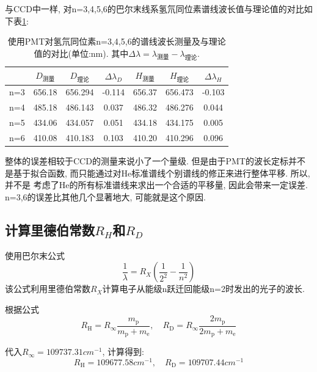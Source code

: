 \documentclass[12pt,a4paper]{article}
\begin{document}
与CCD中一样, 对n=3,4,5,6的巴尔末线系氢氘同位素谱线波长值与理论值的对比如下表\ref{Char3}: 
\begin{table}[H]
    \centering
    \begin{tabular}{|c|c|c|c|c|c|c|}
    \hline
        & $D_{\text{测量}}$      & $D_{\text{理论}}$      & $\Delta \lambda_{D} $ & $H_{\text{测量}}$      & $H_{\text{理论}}$     & $\Delta \lambda_{H} $  \\ \hline
    n=3 & 656.18 & 656.294 & -0.114 & 656.37 & 656.473 & -0.103 \\ \hline
    n=4 & 485.18 & 486.143 & 0.037 & 486.32 & 486.276 & 0.044 \\ \hline
    n=5 & 434.06 & 434.057 & 0.051 & 434.18 & 434.175 & 0.005 \\ \hline
    n=6 & 410.08 & 410.183 & 0.103 & 410.20 & 410.296& 0.096 \\ \hline
    \end{tabular}
    \label{Char3}
    \caption{使用PMT对氢氘同位素n=3,4,5,6的谱线波长测量及与理论值的对比(单位:nm).
    其中$\Delta \lambda=\lambda_{\text{测量}}-\lambda_{\text{理论}}$.}
    \end{table}
整体的误差相较于CCD的测量来说小了一个量级. 但是由于PMT的波长定标并不是基于拟合函数, 而只能通过对He标准谱线个别谱线的修正来进行整体平移. 所以, 并不是
考虑了He的所有标准谱线来求出一个合适的平移量, 因此会带来一定误差. n=3,6的误差比其他几个显著地大, 可能就是这个原因. 

\subsection{计算里德伯常数$R_{H}$和$R_{D}$}
使用巴尔末公式
\begin{equation}
    \frac{1}{\lambda}=R_{X}(\frac{1}{2^2}-\frac{1}{n^2})
\end{equation}
该公式利用里德伯常数$R_{X}$计算电子从能级n跃迁回能级n=2时发出的光子的波长. 

根据公式
\begin{equation}
    R_{\mathrm{H}}=R_{\infty} \frac{m_{\mathrm{p}}}{m_{\mathrm{p}}+m_{\mathrm{e}}}, \quad R_{\mathrm{D}}=R_{\infty} \frac{2 m_{\mathrm{p}}}{2 m_{\mathrm{p}}+m_{\mathrm{e}}}
\end{equation}

代入$R_{\infty}=109737.31 cm^{-1}$, 计算得到:
\begin{equation}
    R_{\mathrm{H}}=109677.58cm^{-1}, \quad R_{\mathrm{D}}=109707.44cm^{-1}
\end{equation}
    
\end{document}
